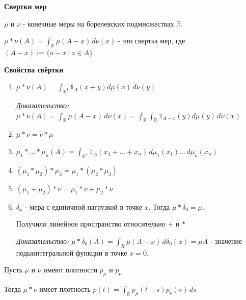 \begin{remark}
    \textbf{Свертки мер}

    $\mu$ и $\nu$ - конечные меры на борелевских подмножествах $\mathbb{R}$.

    $\mu * \nu (A) = \int_{\mathbb{R}} \mu (A - x) \, d\nu (x)$ - это свертка мер, где $(A - x) := \{ a - x \ | \ a \in A \}$.

    \begin{properties}
        \textbf{Свойства свёртки}

        \begin{enumerate}
            \item {
                $\mu * \nu (A) = \int_{\mathbb{R}^2} \mathds{1}_A (x + y) d\mu (x) \, d\nu (y)$

                \textit{Доказательство: } $\mu * \nu (A) = \int_{\mathbb{R}} \mu (A - x) \, d\nu (x) =
                \int_{\mathbb{R}} \int_{\mathbb{R}} \mathds{1}_{A - x} (y) d\mu (y) \, d\nu (x)$
            }
            \item {
                $\mu * \nu = \nu * \mu$
            }
            \item {
                $\mu_1 * \ldots * \mu_n (A) = \int_{\mathbb{R}^n} \mathds{1}_A (x_1 + \ldots + x_n) \, d\mu_1 (x_1) \ldots \, d \mu_n (x_n)$
            }
            \item {
                $(\mu_1 * \mu_2) * \mu_3 = \mu_1 * (\mu_2 * \mu_3)$
            }
            \item {
                $(\mu_1 + \mu_2) * \nu = \mu_1 * \nu + \mu_2 * \nu$
            }
            \item {
                $\delta_x$ - мера с единичной нагрузкой в точке $x$. Тогда $\mu * \delta_0 = \mu$.

                Получили линейное пространство относительно $+$ и $*$

                \textit{Доказательство:} $\mu * \delta_0 (A) = \int_R \mu (A - x) \, d\delta_0 (x) = 
                \mu A$ - значение подыинтегральной функции в точке $x = 0$.
            }
        \end{enumerate}
    \end{properties}
\end{remark}

\begin{theorem}
    Пусть $\mu$ и $\nu$ имеют плотности $p_{\mu}$ и $p_{\nu}$

    Тогда $\mu * \nu$ имеет плотность $p(t) = \int_{\mathbb{R}} p_{\mu} (t - s) p_{\nu} (s) \, ds$
\end{theorem}

